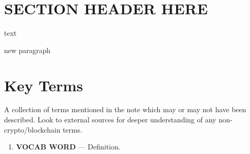 \documentclass[full.tex]{subfiles}
\begin{document}
    \thispagestyle{firstpage}
    \vspace*{3\baselineskip}
    \section*{SECTION HEADER HERE}
    text
    
    new paragraph
    
    \newpage
    \thispagestyle{firstpage}
    \vspace*{2\baselineskip}
    \section*{Key Terms}
    \noindent A collection of terms mentioned in the note which may or may not have been described. Look to external sources for deeper understanding of any non-crypto/blockchain terms.
    \begin{enumerate}
        \item \textbf{VOCAB WORD} --- Definition. %
    \end{enumerate}
\end{document}
